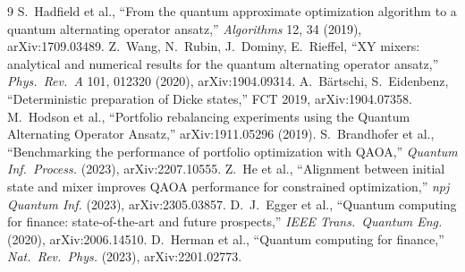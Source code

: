 \documentclass[10pt,a4paper,twocolumn]{article}
\begin{document}
\begin{thebibliography}{9}\footnotesize
{} S.~Hadfield et al., ``From the quantum approximate optimization algorithm to a quantum alternating operator ansatz,'' \emph{Algorithms} 12, 34 (2019), arXiv:1709.03489.
 Z.~Wang, N.~Rubin, J.~Dominy, E.~Rieffel, ``XY mixers: analytical and numerical results for the quantum alternating operator ansatz,'' \emph{Phys.\ Rev.\ A} 101, 012320 (2020), arXiv:1904.09314.
 A.~B\"artschi, S.~Eidenbenz, ``Deterministic preparation of Dicke states,'' FCT 2019, arXiv:1904.07358.
 M.~Hodson et al., ``Portfolio rebalancing experiments using the Quantum Alternating Operator Ansatz,'' arXiv:1911.05296 (2019).
 S.~Brandhofer et al., ``Benchmarking the performance of portfolio optimization with QAOA,'' \emph{Quantum Inf.\ Process.} (2023), arXiv:2207.10555.
 Z.~He et al., ``Alignment between initial state and mixer improves QAOA performance for constrained optimization,'' \emph{npj Quantum Inf.} (2023), arXiv:2305.03857.
 D.~J.~Egger et al., ``Quantum computing for finance: state-of-the-art and future prospects,'' \emph{IEEE Trans.\ Quantum Eng.} (2020), arXiv:2006.14510.
 D.~Herman et al., ``Quantum computing for finance,'' \emph{Nat.\ Rev.\ Phys.} (2023), arXiv:2201.02773.
\end{thebibliography}
\end{document}
